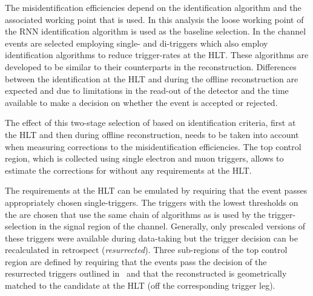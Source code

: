 The \tauhadvis misidentification efficiencies depend on the \tauhadvis
identification algorithm and the associated working point that is
used. In this analysis the loose working point of the RNN \tauhadvis
identification algorithm is used as the baseline \tauhadvis
selection. In the \hadhad channel events are selected employing
single- and di-\tauhadvis triggers which also employ identification
algorithms to reduce trigger-rates at the HLT. These algorithms are
developed to be similar to their counterparts in the \tauhadvis
reconstruction. Differences between the identification
at the HLT and during the offline reconstruction are expected and due
to limitations in the read-out of the detector and the time available
to make a decision on whether the event is accepted or rejected.

The effect of this two-stage selection of \tauhadvis based on
identification criteria, first at the HLT and then during offline
reconstruction, needs to be taken into account when measuring
corrections to the \tauhadvis misidentification efficiencies. The top
control region, which is collected using single electron and muon
triggers, allows to estimate the corrections for \tauhadvis without
any requirements at the HLT.

The requirements at the HLT can be emulated by requiring that the
event passes appropriately chosen single-\tauhadvis triggers. The
triggers with the lowest thresholds on the \tauhadvis \pT are chosen
that use the same chain of algorithms as is used by the trigger-selection in the signal
region of the \hadhad channel. Generally, only prescaled versions of
these triggers were available during data-taking but the trigger
decision can be recalculated in retrospect
(\textit{resurrected}). Three sub-regions of the top control region
are defined by requiring that the events pass the decision of the
resurrected triggers outlined in~ and
that the reconstructed \tauhadvis is geometrically matched to the
\tauhadvis candidate at the HLT (off the corresponding \tauhadvis
trigger leg).

